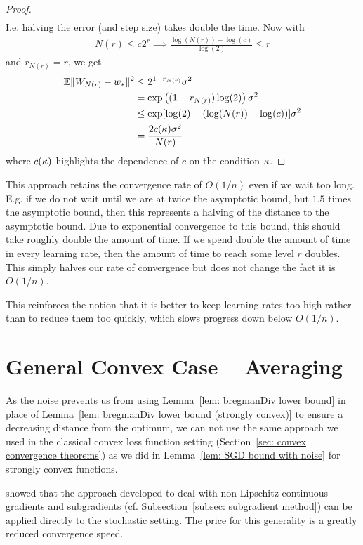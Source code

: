 \begin{proof}
\begin{align*}
	\end{align*}
	I.e. halving the error (and step size) takes double the time. Now with
	\begin{align*}
		N(r) \le c2^r \implies \frac{\log(N(r)) - \log(c)}{\log(2)} \le r
	\end{align*}
	and \(r_{N(r)} = r\), we get
	\begin{align*}
		\mathbb{E}\|W_{N(r)}-w_*\|^2 
		&\le 2^{1-r_{N(r)}}\sigma^2\\
		&= \exp\left((1-r_{N(r)})\log(2)\right)\sigma^2\\
		&\le \exp[\log(2)- (\log(N(r)) - \log(c))]\sigma^2\\
		&=  \frac{2c(\kappa)\sigma^2}{N(r)}
	\end{align*}
	where \(c(\kappa)\) highlights the dependence of \(c\) on the condition
	\(\kappa\).
\end{proof}

This approach retains the convergence rate of \(O(1/n)\) even if we wait too long.
E.g. if we do not wait until we are at twice the asymptotic bound, but \(1.5\)
times the asymptotic bound, then this represents a halving of the distance to
the asymptotic bound. Due to exponential convergence to this bound, this should
take roughly double the amount of time. If we spend double the amount of time in
every learning rate, then the amount of time to reach some level \(r\) doubles.
This simply halves our rate of convergence but does not change the fact it is
\(O(1/n)\).

This reinforces the notion that it is better to keep learning rates too high
rather than to reduce them too quickly, which slows progress down below \(O(1/n)\).

\section{General Convex Case -- Averaging}\label{sec: SGD with Averaging}

As the noise prevents us from using Lemma~\ref{lem: bregmanDiv lower bound} in
place of Lemma~\ref{lem: bregmanDiv lower bound (strongly convex)} to ensure a
decreasing distance from the optimum, we can not use the same approach we used
in the classical convex loss function setting (Section~\ref{sec: convex convergence theorems})
as we did in Lemma~\ref{lem: SGD bound with noise} for strongly convex functions.

\textcite{nemirovskiRobustStochasticApproximation2009} showed that the approach
developed to deal with non Lipschitz continuous gradients and subgradients (cf.
Subsection~\ref{subsec: subgradient method}) can be applied directly to the
stochastic setting. The price for this generality is a greatly reduced
convergence speed.

